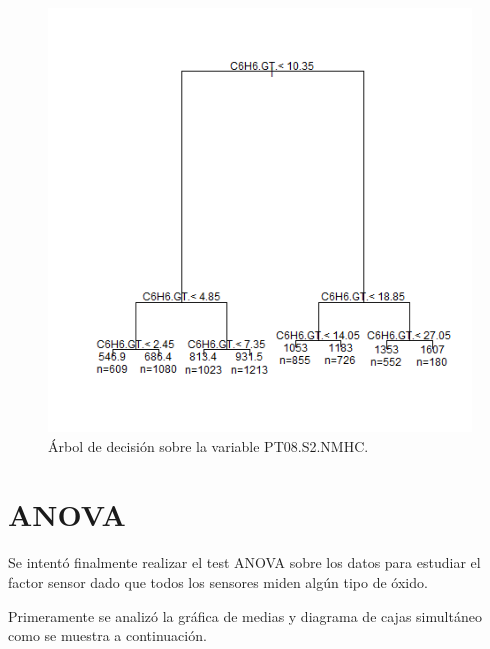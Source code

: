 \documentclass[a4paper,10pt,twocolumn]{article}
\begin{document}
  \begin{figure}[htb]%
  	\begin{center}
  		\includegraphics[width=\linewidth]{Images/decision_tree_second_try.png}
  	\end{center}
  	\caption{Árbol de decisión sobre la variable PT08.S2.NMHC.}
  	\label{fig:pt08}
  \end{figure}

\newpage

\section{ANOVA}
 Se intentó finalmente realizar el test ANOVA sobre los datos para estudiar el factor sensor dado que todos los sensores miden algún tipo de óxido.
 
 Primeramente se analizó la gráfica de medias y diagrama de cajas simultáneo como se muestra a continuación. 
 
\end{document}
